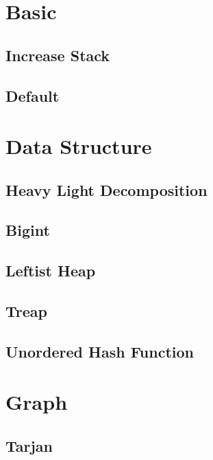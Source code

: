 \section{Basic}
\subsection{Increase Stack}

\subsection{Default}

\section{Data Structure}
\subsection{Heavy Light Decomposition}

\subsection{Bigint}

\subsection{Leftist Heap}

\subsection{Treap}

\subsection{Unordered Hash Function}

\section{Graph}
\subsection{Tarjan}

